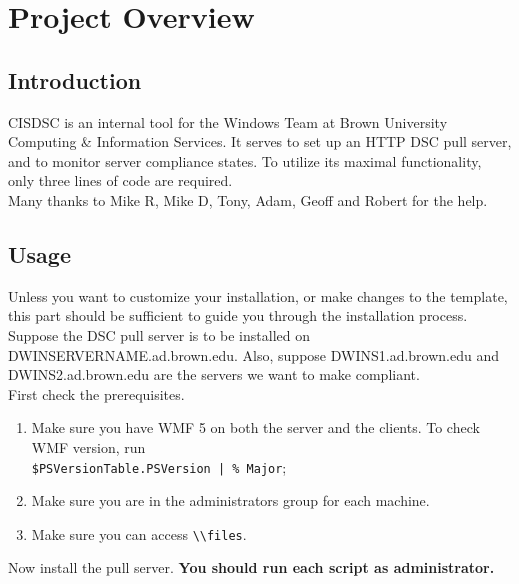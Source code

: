 \chapter{Project Overview}
\label{overview}

  \section{Introduction}
    CISDSC is an internal tool for the Windows Team at Brown University Computing \& Information Services. It serves to set up an HTTP DSC pull server, and to monitor server compliance states. To utilize its maximal functionality, only three lines of code are required.\\
    Many thanks to Mike R, Mike D, Tony, Adam, Geoff and Robert for the help.

  \section{Usage}
    Unless you want to customize your installation, or make changes to the template, this part should be sufficient to guide you through the installation process. Suppose the DSC pull server is to be installed on DWINSERVERNAME.ad.brown.edu. Also, suppose DWINS1.ad.brown.edu and DWINS2.ad.brown.edu are the servers we want to make compliant.\\
    First check the prerequisites.
    \begin{enumerate}[label=(\roman*)]
      \item Make sure you have WMF 5 on both the server and the clients. To check WMF version, run\\
      \verb^$PSVersionTable.PSVersion | % Major^;
      \item Make sure you are in the administrators group for each machine.
      \item Make sure you can access \verb^\\files^.
    \end{enumerate}
    Now install the pull server. \textbf{You should run each script as administrator.}
